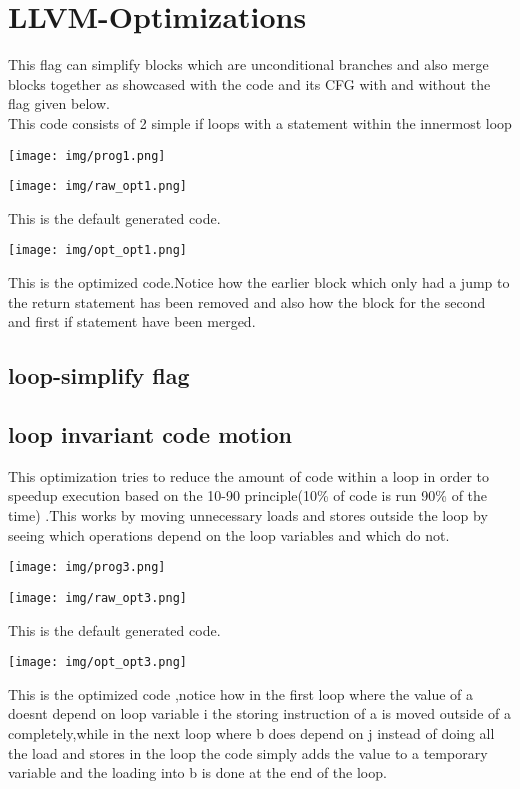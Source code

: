 \documentclass[a4paper, 12pt]{article}
\begin{document}

\renewcommand*\contentsname{Index}
\tableofcontents
\newpage
\section{LLVM-Optimizations}
This flag can simplify blocks which are unconditional branches and also merge blocks together as  showcased with the code and its CFG with and without the flag given below. 
\\
This code consists of 2 simple if loops with a statement within the innermost loop
\begin{center}
    \texttt{[image: img/prog1.png]}
\end{center}

\begin{center}
    \texttt{[image: img/raw\_opt1.png]}
\end{center}
This is the default generated code.
\begin{center}
    \texttt{[image: img/opt\_opt1.png]}
\end{center}
This is the optimized code.Notice how the earlier block which only had a jump to the return statement has been removed and also how the block for the second and first if statement have been merged.
\subsection{loop-simplify flag}
\subsection{loop invariant code motion}
This optimization tries to reduce the amount of code within a loop in order to speedup execution based on the 10-90 principle(10\% of code is run 90\% of the time) .This works by moving unnecessary loads and stores outside the loop by seeing which operations depend on the loop variables and which do not.
\begin{center}
    \texttt{[image: img/prog3.png]}
\end{center}
\begin{center}
    \texttt{[image: img/raw\_opt3.png]}
\end{center}
This is the default generated code.
\begin{center}
    \texttt{[image: img/opt\_opt3.png]}
\end{center}
This is the optimized code ,notice how in the first loop where the value of a doesnt depend on loop variable i the storing instruction of a is moved outside of a completely,while in the next loop where b does depend on j instead of doing all the load and stores in the loop the code simply adds the value to a temporary variable and the loading into b is done at the end of the loop. 
\end{document}
